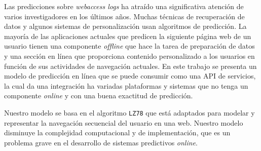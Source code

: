 {Las predicciones sobre \emph{webaccess logs} ha atraído una significativa atención de varios investigadores en los últimos años. Muchas técnicas de recuperación de datos y algunos sistemas de personalización usan algoritmos de predicción. La mayoría de las aplicaciones actuales que predicen la siguiente página web de un usuario tienen una componente  \emph{offline} que hace la tarea de preparación de datos y una sección en línea que proporciona contenido personalizado a los usuarios en función de sus actividades de navegación actuales. En este trabajo se presenta un modelo de predicción en línea que se puede consumir como una {API} de servicios, la cual da una integración ha variadas plataformas y sistemas que no tenga un componente \emph{online} y con una buena exactitud de predicción. 

Nuestro modelo se basa en el algoritmo \texttt{LZ78} que está adaptados para modelar y representar la navegación secuencial del usuario en una web. Nuestro modelo disminuye la complejidad computacional  y de implementación, que es un problema grave en el desarrollo de sistemas predictivos \emph{online}.
}

  

